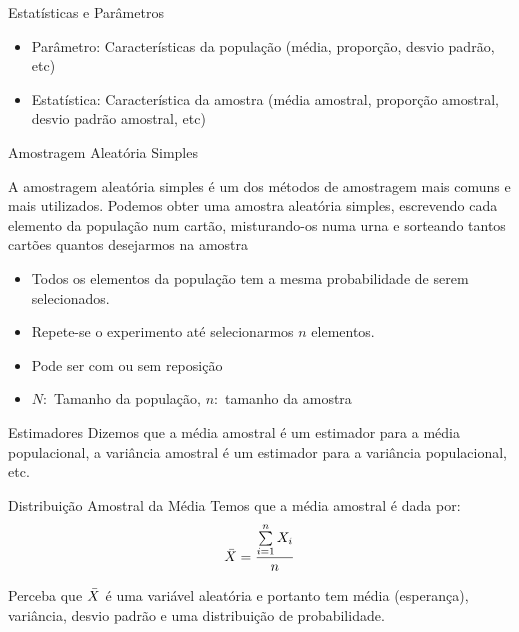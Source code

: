 \documentclass{beamer}
\begin{document}
\begin{frame}{Estatísticas e Parâmetros}
\begin{itemize}
    \item Parâmetro: Características da população (média, proporção, desvio padrão, etc)
    \item Estatística: Característica da amostra (média amostral, proporção amostral, desvio padrão amostral, etc)
\end{itemize}
    
\end{frame}
\begin{frame}{Amostragem Aleatória Simples}

A amostragem aleatória simples é um dos métodos de amostragem mais comuns e mais utilizados. Podemos obter uma amostra aleatória simples, escrevendo cada elemento da população num cartão, misturando-os numa urna e sorteando tantos cartões quantos desejarmos na amostra

\begin{itemize}
    \item Todos os elementos da população tem a mesma probabilidade de serem selecionados.
    \item Repete-se o experimento até selecionarmos $n$ elementos.
    \item Pode ser com ou sem reposição
    \item $N:$ Tamanho da população, $n:$ tamanho da amostra
\end{itemize}
\end{frame}

\begin{frame}{Estimadores}
    Dizemos que a média amostral é um estimador para a média populacional, a variância amostral é um estimador para a variância populacional, etc. 
    
\end{frame}

\begin{frame}{Distribuição Amostral da Média}
    Temos que a média amostral é dada por:
    $$\Bar{X} = \dfrac{\sum\limits_{i=1}^n X_i}{n}$$

    Perceba que $\Bar{X}$ é uma variável aleatória e portanto tem média (esperança), variância, desvio padrão e uma distribuição de probabilidade.
\end{frame}
\end{document}
